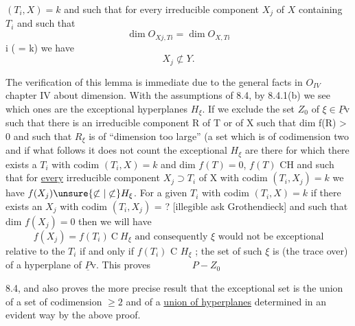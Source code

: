 
$(T_i, X) = k$ and such that for every irreducible component $X_j$ of $X$
containing $T_i$ and such that
\[ \dim O_{Xj, Ti} = \dim O_{X, Ti} \]
i ( = k) we have
\[ X_j \not\subset Y. \]

The verification of this lemma is immediate due to the general
facts in $O_{IV}$ chapter IV about dimension.  With the assumptions of
8.4, by 8.4.1(b) we see which ones are the exceptional hyperplanes
$H_\xi$.  If we exclude the set $Z_0$ of $\xi \in \underline{P}\mathrm{v}$ such that there is an
irreducible component R of T or of X such that dim f(R) > 0 and
such that $R_\xi$ is of ``dimension too large'' (a set which is of
codimension two and if what follows it does not count the
exceptional $H_\xi$ are there for which there exists a $T_i$ with codim
$(T_i, X) = k$ and dim $f(T) = 0$, $f(T)$ CH and such that for \uline{every}
irreducible component $X_j \supset T_i$ of X with codim $(T_i, X_j) = k$ we have
$f(X_j) \unsure{\not\subset|\not\subset} H_\xi$.  For a given $T_i$ with codim $(T_i, X) = k$ if there exists
an $X_j$ with codim $(T_i, X_j)$ = ? [illegible ask Grothendieck]
and such that dim $f(X_j) = 0$ then we will have
\[ f(X_j) = f(T_i)\ \mathrm{C}\ H_\xi \text{ and consequently } \xi \text{ would not be exceptional} \]
relative to the $T_i$ if and only if $f(T_i)$ C $H_\xi$ ; the set of such $\xi$ is
(the trace over) of a hyperplane of $\underline{P}\mathrm{v}$.  This proves
$\qquad\qquad P - Z_0$

8.4, and also proves the more precise result that the exceptional
set is the union of a set of codimension $\geq 2$ and of a \uline{union of
hyperplanes} determined in an evident way by the above proof.

